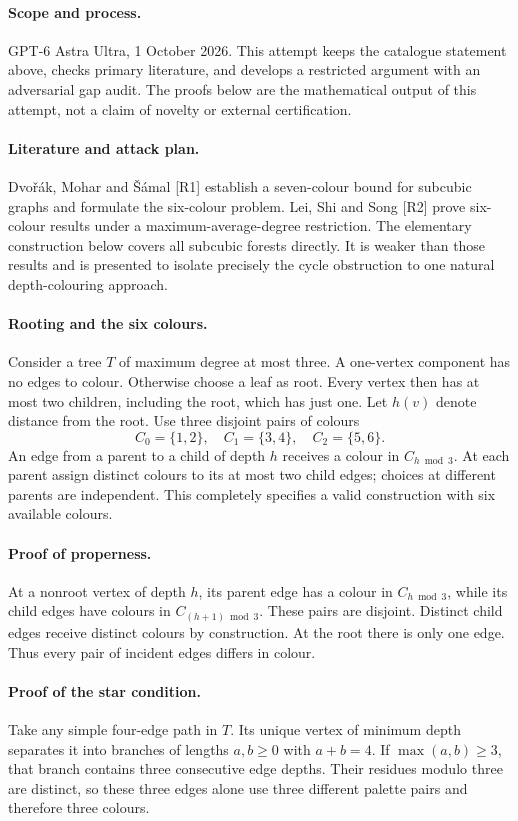 \documentclass[11pt,a4paper]{article}
\begin{document}
\paragraph{Scope and process.}
GPT-6 Astra Ultra, 1 October 2026. This attempt keeps the catalogue statement above, checks primary literature, and develops a restricted argument with an adversarial gap audit. The proofs below are the mathematical output of this attempt, not a claim of novelty or external certification.

\paragraph{Literature and attack plan.}
Dvořák, Mohar and Šámal [R1] establish a seven-colour bound for subcubic graphs and formulate the six-colour problem. Lei, Shi and Song [R2] prove six-colour results under a maximum-average-degree restriction. The elementary construction below covers all subcubic forests directly. It is weaker than those results and is presented to isolate precisely the cycle obstruction to one natural depth-colouring approach.

\paragraph{Rooting and the six colours.}
Consider a tree $T$ of maximum degree at most three. A one-vertex component has no edges to colour. Otherwise choose a leaf as root. Every vertex then has at most two children, including the root, which has just one. Let $h(v)$ denote distance from the root. Use three disjoint pairs of colours
\[
 C_0=\{1,2\},\quad C_1=\{3,4\},\quad C_2=\{5,6\}.
\]
An edge from a parent to a child of depth $h$ receives a colour in $C_{h\bmod3}$. At each parent assign distinct colours to its at most two child edges; choices at different parents are independent. This completely specifies a valid construction with six available colours.

\paragraph{Proof of properness.}
At a nonroot vertex of depth $h$, its parent edge has a colour in $C_{h\bmod3}$, while its child edges have colours in $C_{(h+1)\bmod3}$. These pairs are disjoint. Distinct child edges receive distinct colours by construction. At the root there is only one edge. Thus every pair of incident edges differs in colour.

\paragraph{Proof of the star condition.}
Take any simple four-edge path in $T$. Its unique vertex of minimum depth separates it into branches of lengths $a,b\ge0$ with $a+b=4$. If $\max(a,b)\ge3$, that branch contains three consecutive edge depths. Their residues modulo three are distinct, so these three edges alone use three different palette pairs and therefore three colours.
\end{document}
